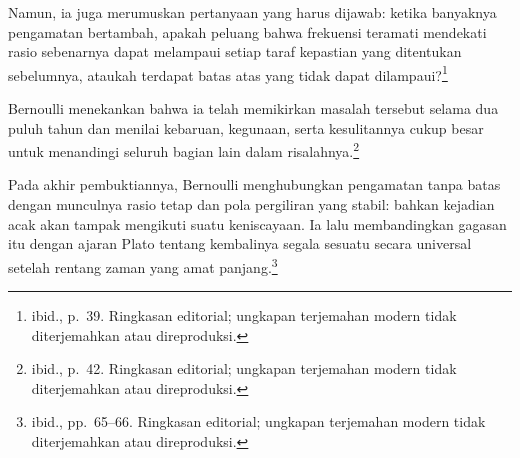 \noindent Namun, ia juga merumuskan pertanyaan yang harus dijawab: ketika banyaknya
pengamatan bertambah, apakah peluang bahwa frekuensi teramati mendekati rasio sebenarnya dapat
melampaui setiap taraf kepastian yang ditentukan sebelumnya, ataukah terdapat batas atas yang
tidak dapat dilampaui?\footnote{ibid., p.~39. Ringkasan editorial; ungkapan terjemahan
modern tidak diterjemahkan atau direproduksi.}

\noindent Bernoulli menekankan bahwa ia telah memikirkan masalah tersebut selama dua
puluh tahun dan menilai kebaruan, kegunaan, serta kesulitannya cukup besar untuk menandingi
seluruh bagian lain dalam risalahnya.\footnote{ibid., p.~42. Ringkasan editorial; ungkapan
terjemahan modern tidak diterjemahkan atau direproduksi.}

\noindent Pada akhir pembuktiannya, Bernoulli menghubungkan pengamatan tanpa batas dengan
munculnya rasio tetap dan pola pergiliran yang stabil: bahkan kejadian acak akan tampak
mengikuti suatu keniscayaan. Ia lalu membandingkan gagasan itu dengan ajaran Plato tentang
kembalinya segala sesuatu secara universal setelah rentang zaman yang amat panjang.\footnote{ibid.,
pp.~65--66. Ringkasan editorial; ungkapan terjemahan modern tidak diterjemahkan atau
direproduksi.}

